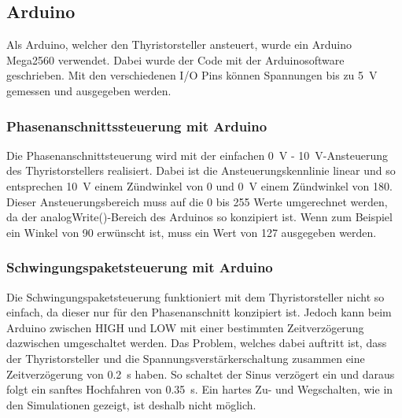 \subsection{Arduino}

Als Arduino, welcher den Thyristorsteller ansteuert, wurde ein Arduino Mega2560 verwendet. Dabei wurde der Code mit der Arduinosoftware geschrieben. Mit den verschiedenen I/O Pins können Spannungen bis zu \SI{5}{V} gemessen und ausgegeben werden.
 

\subsubsection*{Phasenanschnittssteuerung mit Arduino}
Die Phasenanschnittsteuerung wird mit der einfachen \SI{0}{V} - \SI{10}{V}-Ansteuerung des Thyristorstellers realisiert. Dabei ist die Ansteuerungskennlinie linear und so entsprechen \SI{10}{V} einem Zündwinkel von 0\textdegree\hspace{0.02cm} und \SI{0}{V} einem Zündwinkel von 180\textdegree. Dieser Ansteuerungsbereich muss auf die 0 bis 255 Werte umgerechnet werden, da der analogWrite()-Bereich des Arduinos so konzipiert ist. Wenn zum Beispiel ein Winkel von 90\textdegree \hspace{0.02cm} erwünscht ist, muss ein Wert von 127 ausgegeben werden.

\subsubsection*{Schwingungspaketsteuerung mit Arduino}
Die Schwingungspaketsteuerung funktioniert mit dem Thyristorsteller nicht so einfach, da dieser nur für den Phasenanschnitt konzipiert ist. Jedoch kann beim Arduino zwischen HIGH und LOW mit einer bestimmten Zeitverzögerung dazwischen umgeschaltet werden. Das Problem, welches dabei auftritt ist, dass der Thyristorsteller und die Spannungsverstärkerschaltung zusammen eine Zeitverzögerung von \SI{0.2}{s} haben. So schaltet der Sinus verzögert ein und daraus folgt ein sanftes Hochfahren von \SI{0.35}{s}. Ein hartes Zu- und Wegschalten, wie in den Simulationen gezeigt, ist deshalb nicht möglich.


